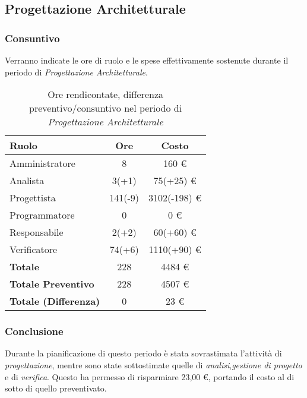 \subsection{Progettazione Architetturale}
\subsubsection{Consuntivo}
Verranno indicate le ore di ruolo e le spese effettivamente sostenute durante il periodo di \textit{Progettazione Architetturale}.

\begin{table}[H]
	\centering
	\begin{tabular}{ l c c }
		\textbf{Ruolo} & \textbf{Ore} & \textbf{Costo} \\
		\hline
		Amministratore & 8 & 160 \euro{} \\
		Analista & 3(+1) & 75(+25) \euro{} \\
		Progettista & 141(-9) & 3102(-198) \euro{} \\
		Programmatore & 0 & 0 \euro{} \\
		Responsabile & 2(+2) & 60(+60) \euro{} \\
		Verificatore & 74(+6) & 1110(+90) \euro{} \\
		\hline
		\textbf{Totale \glossaryItem{Consuntivo}} & 228 & 4484 \euro{} \\
		\hline
		\textbf{Totale Preventivo} & 228 & 4507 \euro{} \\
		\hline
		\textbf{Totale (Differenza)} & 0 & 23 \euro{} \\
		\hline
	\end{tabular}
	\caption{Ore rendicontate, differenza preventivo/consuntivo nel periodo di \textit{Progettazione Architetturale}}
\end{table}



\subsubsection{Conclusione}
Durante la pianificazione di questo periodo \`e stata sovrastimata l'attivit\`a di \textit{progettazione}, mentre sono state sottostimate quelle di \textit{analisi},\textit{gestione di progetto} e di \textit{verifica}.
Questo ha permesso di risparmiare 23,00 \euro{}, portando il costo  al di sotto di quello preventivato.

